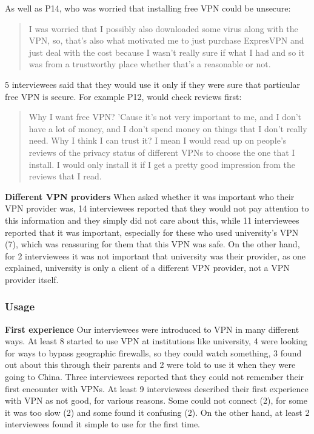 As well as P14, who was worried that installing free VPN could be unsecure:
\begin{quote}I was worried that I possibly also downloaded some virus along
with the VPN, so, that's also what motivated me to just purchase ExpresVPN and
just deal with the cost because I wasn't really sure if what I had and so it
was from a trustworthy place whether that's a reasonable or not.\end{quote}

5 interviewees said that they would use it only if they were sure that
particular free VPN is secure. For example P12, would check reviews first:
\begin{quote}Why I want free VPN? 'Cause it's not very important to me, and I
don't have a lot of money, and I don't spend money on things that I don't
really need. Why I think I can trust it? I mean I would read up on people's
reviews of the privacy status of different VPNs to choose the one that I
install. I would only install it if I get a pretty good impression from the
reviews that I read.\end{quote}

\textbf{Different VPN providers} When asked whether it was important who their
VPN provider was, 14 interviewees reported that they would not pay attention
to this information and they simply did not care about this, while 11
interviewees reported that it was important, especially for these who used
university’s VPN (7), which was reassuring for them that this VPN was safe. On
the other hand, for 2 interviewees it was not important that university was
their provider, as one explained, university is only a client of a different
VPN provider, not a VPN provider itself. 






\subsubsection{Usage} \textbf{First experience} Our interviewees were
introduced to VPN in many different ways. At least 8 started to use VPN at
institutions like university, 4 were looking for ways to bypass geographic
firewalls, so they could watch something, 3 found out about this through their
parents and 2 were told to use it when they were going to China. Three
interviewees reported that they could not remember their first encounter with
VPNs.  At least 9 interviewees described their first experience with VPN as
not good, for various reasons. Some could not connect (2), for some it was too
slow (2) and some found it confusing (2).  On the other hand, at least 2
interviewees found it simple to use for the first time.

